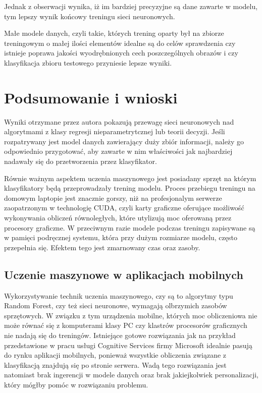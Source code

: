 \documentclass[brudnopis]{xmgr}
\begin{document}
Jednak z obserwacji wynika, iż im bardziej precyzyjne są dane zawarte w modelu, tym lepszy wynik końcowy treningu sieci neuronowych.

Małe modele danych, czyli takie, których trening oparty był na zbiorze treningowym o małej ilości elementów idealne są do celów sprawdzenia czy istnieje poprawa jakości wyodrębnionych cech poszczególnych obrazów i czy klasyfikacja zbioru testowego przyniesie lepsze wyniki.

\chapter{Podsumowanie i wnioski}

Wyniki otrzymane przez autora pokazują przewagę sieci neuronowych nad algorytmami z klasy regresji nieparametrytcznej lub teorii decyzji. Jeśli rozpatrywany jest model danych zawierający duży zbiór informacji, należy go odpowiednio przygotować, aby zawarte w nim właściwości jak najbardziej nadawały się do przetworzenia przez klasyfikator. 

Równie ważnym aspektem uczenia maszynowego jest posiadany sprzęt na którym klasyfikatory będą przeprowadzały trening modelu. Proces przebiegu treningu na domowym laptopie jest znacznie gorszy, niż na profesjonalym serwerze zaopatrzonym w technologię CUDA, czyli karty graficzne oferujące możliwość wykonywania obliczeń równoległych, które utylizują moc oferowaną przez procesory graficzne. W przeciwnym razie modele podczas treningu zapisywane są w pamięci podręcznej systemu, która przy dużym rozmiarze modelu, często przepełnia się. Efektem tego jest zmarnowany czas oraz zasoby.

\section{Uczenie maszynowe w aplikacjach mobilnych}

Wykorzystywanie technik uczenia maszynowego, czy są to algorytmy typu Random Forest, czy też sieci neuronowe, wymagają olbrzymich zasobów sprzętowych. W związku z tym urządzenia mobilne, których moc obliczeniowa nie może równać się z komputerami klasy PC czy klastrów procesorów graficznych nie nadają się do treningów. Istniejące gotowe rozwiązania jak na przykład przedstawione w pracu usługi Cognitive Services firmy Microsoft idealnie pasują do rynku aplikacji mobilnych, ponieważ wszystkie obliczenia związane z klasyfikacją znajdują się po stronie serwera. Wadą tego rozwiązania jest natomiast brak ingerencji w modele danych oraz brak jakiejkolwiek personalizacji, który mógłby pomóc w rozwiązaniu problemu.
\end{document}
